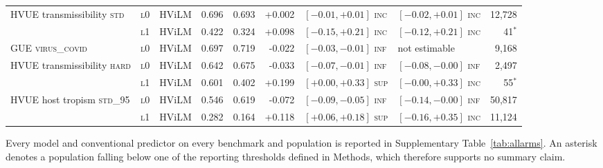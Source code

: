 \begin{longtable}{ll l rr r ll r}
\addlinespace
HVUE transmissibility \textsc{std} & \textsc{l0} & HViLM & 0.696 & 0.693 & +0.002 & $[-0.01, +0.01]$ \textsc{inc} & $[-0.02, +0.01]$ \textsc{inc} & 12,728 \\
 & \textsc{l1} & HViLM & 0.422 & 0.324 & +0.098 & $[-0.15, +0.21]$ \textsc{inc} & $[-0.12, +0.21]$ \textsc{inc} & 41$^{*}$ \\
\addlinespace
GUE \textsc{virus\_covid} & \textsc{l0} & HViLM & 0.697 & 0.719 & -0.022 & $[-0.03, -0.01]$ \textsc{inf} & not estimable & 9,168 \\
\addlinespace
HVUE transmissibility \textsc{hard} & \textsc{l0} & HViLM & 0.642 & 0.675 & -0.033 & $[-0.07, -0.01]$ \textsc{inf} & $[-0.08, -0.00]$ \textsc{inf} & 2,497 \\
 & \textsc{l1} & HViLM & 0.601 & 0.402 & +0.199 & $[+0.00, +0.33]$ \textsc{sup} & $[-0.00, +0.33]$ \textsc{inc} & 55$^{*}$ \\
\addlinespace
HVUE host tropism \textsc{std\_95} & \textsc{l0} & HViLM & 0.546 & 0.619 & -0.072 & $[-0.09, -0.05]$ \textsc{inf} & $[-0.14, -0.00]$ \textsc{inf} & 50,817 \\
 & \textsc{l1} & HViLM & 0.282 & 0.164 & +0.118 & $[+0.06, +0.18]$ \textsc{sup} & $[-0.16, +0.35]$ \textsc{inc} & 11,124 \\
\bottomrule
\end{longtable}
\vspace{-8pt}\par\noindent\footnotesize Every model and conventional predictor on every benchmark and population is reported in Supplementary Table~\ref{tab:allarms}. An asterisk denotes a population falling below one of the reporting thresholds defined in Methods, which therefore supports no summary claim.
\endgroup

